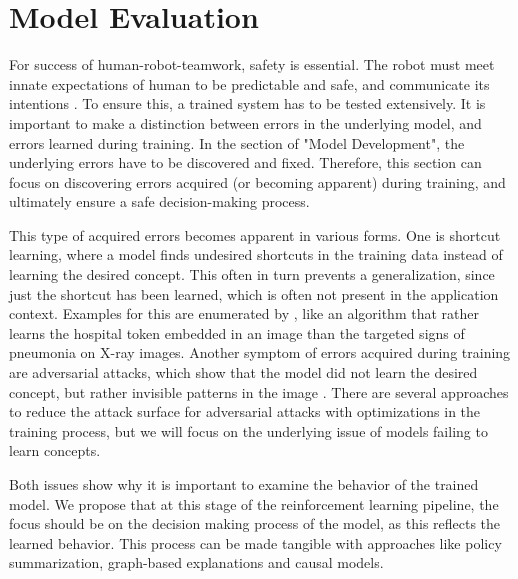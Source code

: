 \documentclass[twoside,11pt]{article}
\begin{document}
\section{Model Evaluation}
For success of human-robot-teamwork, safety is essential. The robot must meet innate expectations of human to be predictable and safe, and communicate its intentions \cite{EderHarperLeonards:2014:HITLRoboticsSafetyAssurance}. To ensure this, a trained system has to be tested extensively. It is important to make a distinction between errors in the underlying model, and errors learned during training. In the section of "Model Development", the underlying errors have to be discovered and fixed. Therefore, this section can focus on discovering errors acquired (or becoming apparent) during training, and ultimately ensure a safe decision-making process.

This type of acquired errors becomes apparent in various forms. One is shortcut learning, where a model finds undesired shortcuts in the training data instead of learning the desired concept. This often in turn prevents a generalization, since just the shortcut has been learned, which is often not present in the application context. Examples for this are enumerated by \citet{GeirhosEtAl:2020:ShortcutLearningDNN}, like an algorithm that rather learns the hospital token embedded in an image than the targeted signs of pneumonia on X-ray images.
Another symptom of errors acquired during training are adversarial attacks, which show that the model did not learn the desired concept, but rather invisible patterns in the image \citep{GoodfellowShlensSzegedy:2014:AdversarialExamples}. There are several approaches to reduce the attack surface for adversarial attacks with optimizations in the training process, but we will focus on the underlying issue of models failing to learn concepts.

Both issues show why it is important to examine the behavior of the trained model. We propose that at this stage of the reinforcement learning pipeline, the focus should be on the decision making process of the model, as this reflects the learned behavior. This process can be made tangible with approaches like policy summarization, graph-based explanations and causal models.

\end{document}
